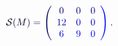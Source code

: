 \documentclass[12pt]{article}
\begin{document}
\makeatletter
\renewcommand*{\@textcolor}[3]{%
  \protect\leavevmode
  \begingroup
    \color#1{#2}#3%
  \endgroup
}
\makeatother
\begin{displaymath}
\mathcal { \mathcolor[RGB]{0,0,15}{S} } \mathcolor[RGB]{0,0,30}{(} \mathcolor[RGB]{0,0,45}{M} \mathcolor[RGB]{0,0,60}{)} \mathcolor[RGB]{0,0,75}{=} \mathcolor[RGB]{0,0,90}{\left(} \begin{array} {ccc} { \mathcolor[RGB]{0,0,105}{0} } & { \mathcolor[RGB]{0,0,120}{0} } & { \mathcolor[RGB]{0,0,135}{0} } \\ { \mathcolor[RGB]{0,0,150}{1} \mathcolor[RGB]{0,0,165}{2} } & { \mathcolor[RGB]{0,0,180}{0} } & { \mathcolor[RGB]{0,0,195}{0} } \\ { \mathcolor[RGB]{0,0,210}{6} } & { \mathcolor[RGB]{0,0,225}{9} } & { \mathcolor[RGB]{0,0,240}{0} } \end{array} \mathcolor[RGB]{0,0,255}{\right)} \mathcolor[RGB]{0,15,0}{.}
\end{displaymath}
\end{document}
